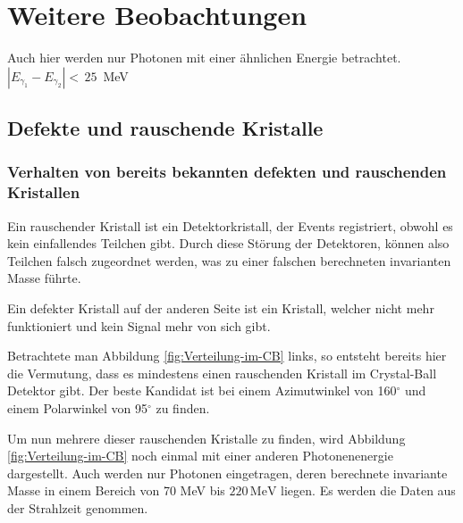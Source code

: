 \documentclass[a4paper,11pt,oneside,final,german,openbib,pdftex]{scrbook}
\begin{document}
{\chapter{Weitere Beobachtungen}
\label{sec:Weitere-Beobachtungen}

Auch hier werden nur Photonen mit einer \"ahnlichen Energie betrachtet. $|E_{\gamma_1}-E_{\gamma_2}|<\, 25\,$ MeV


\section{Defekte und rauschende Kristalle}


\subsection{Verhalten von bereits bekannten defekten und rauschenden Kristallen}
\label{sec:Bekannte-Dead-Crystals}
Ein rauschender Kristall ist ein Detektorkristall, der Events registriert, obwohl es kein einfallendes Teilchen gibt. Durch diese St\"orung der Detektoren, k\"onnen also Teilchen falsch zugeordnet werden, was zu einer falschen berechneten invarianten Masse f\"uhrte. 

Ein defekter Kristall auf der anderen Seite ist ein Kristall, welcher nicht mehr funktioniert und kein Signal mehr von sich gibt.

Betrachtete man Abbildung \ref{fig:Verteilung-im-CB} links, so entsteht bereits hier die Vermutung, dass es mindestens einen rauschenden Kristall im Crystal-Ball Detektor gibt. Der beste Kandidat ist bei einem Azimutwinkel von 160$^{\circ}$ und einem Polarwinkel von 95$^{\circ}$ zu finden.

Um nun mehrere dieser rauschenden Kristalle zu finden, wird Abbildung \ref{fig:Verteilung-im-CB} noch einmal mit einer anderen Photonenenergie dargestellt. Auch werden nur Photonen eingetragen, deren berechnete invariante Masse in einem Bereich von 70 MeV bis $220\, \text{MeV}$ liegen. Es werden die Daten aus der Strahlzeit genommen.

}
\end{document}
